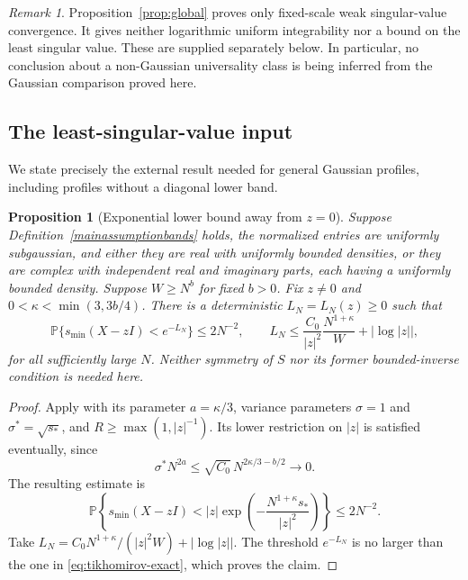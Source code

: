 \documentclass[11pt,reqno]{amsart}
\numberwithin{equation}{section}
\theoremstyle{plain}
\newtheorem{proposition}[theorem]{Proposition}
\theoremstyle{definition}
\theoremstyle{remark}
\newtheorem{remark}[theorem]{Remark}
\begin{document}
\begin{remark}
Proposition~\ref{prop:global} proves only fixed-scale weak singular-value
convergence.  It gives neither logarithmic uniform integrability nor a
bound on the least singular value.  These are supplied separately below.
In particular, no conclusion about a non-Gaussian universality class is
being inferred from the Gaussian comparison proved here.
\end{remark}

\subsection{The least-singular-value input}
We state precisely the external result needed for general Gaussian
profiles, including profiles without a diagonal lower band.

\begin{proposition}[Exponential lower bound away from $z=0$]\label{prop:external-lsv}
Suppose Definition~\ref{mainassumptionbands} holds, the normalized entries
are uniformly subgaussian, and either they are real with uniformly bounded
densities, or they are complex with independent real and imaginary parts,
each having a uniformly bounded density. Suppose $W\geq N^b$ for fixed
$b>0$. Fix $z\ne0$ and $0<\kappa<\min(3,3b/4)$. There is a deterministic
$L_N=L_N(z)\geq0$ such that
\begin{equation}\label{eq:external-lsv-event}
 \mathbb P\{s_{\min}(X-zI)<e^{-L_N}\}\leq2N^{-2},
 \qquad L_N\leq\frac{C_0}{|z|^2}\frac{N^{1+\kappa}}W
                   +|\log|z||,
\end{equation}
for all sufficiently large $N$. Neither symmetry of $S$ nor its former
bounded-inverse condition is needed here.
\end{proposition}
\begin{proof}
Apply \cite[Theorem~3.4]{tikhomirov2023pseudospectrum} with its parameter
$a=\kappa/3$, variance parameters $\sigma=1$ and $\sigma^*=\sqrt{s_*}$,
and $R\geq\max(1,|z|^{-1})$. Its lower restriction on $|z|$ is satisfied
eventually, since
\[
 \sigma^*N^{2a}\leq\sqrt{C_0}\,N^{2\kappa/3-b/2}\longrightarrow0.
\]
The resulting estimate is
\begin{equation}\label{eq:tikhomirov-exact}
 \mathbb P\left\{s_{\min}(X-zI)
 <|z|\exp\left(-\frac{N^{1+\kappa}s_*}{|z|^2}\right)\right\}
 \leq2N^{-2}.
\end{equation}
Take $L_N=C_0N^{1+\kappa}/(|z|^2W)+|\log|z||$.
The threshold $e^{-L_N}$ is no larger than the one in
\eqref{eq:tikhomirov-exact}, which proves the claim.
\end{proof}
\end{document}
